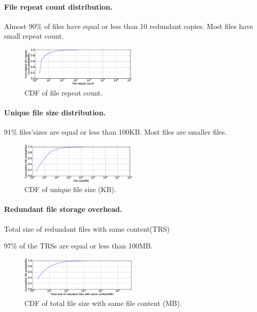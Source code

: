 \paragraph{File repeat count distribution.}

Almost 90\% of files have equal or less than 10 redundant copies. Most files have small repeat count.

\begin{figure}
	\centering
	\includegraphics[width=0.5\textwidth]{graphs/File_repeat_count.eps}
	\caption{CDF of file repeat count.
	}
	\label{fig_file_repeat_count}
\end{figure}

\paragraph{Unique file size distribution.}

91\% files'sizes are equal or less than 100KB. Most files are smaller files.

\begin{figure}
	\centering
	\includegraphics[width=0.5\textwidth]{graphs/File_size-KB.eps}
	\caption{CDF of unique file size (KB).
	}
	\label{fig_file_size}
\end{figure}

\paragraph{Redundant file storage overhead.}

Total size of redundant files with same content(TRS)

97\% of the TRSs are equal or less than 100MB.

\begin{figure}
	\centering
	\includegraphics[width=0.5\textwidth]{graphs/Total_size_of_redudant_files_with_same_content-KB.eps}
	\caption{CDF of total file size with same file content (MB).
	}
	\label{fig_total_redundant_same_digest}
\end{figure}

